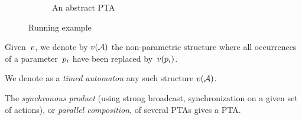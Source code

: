 \begin{tikzborder}{\cite{Gargantini16:validation}}
\begin{tikzborder}{\cite{gargantini_combinatorial_2017}}
\begin{tikzborder}{\cite{gargantini_combinatorial_2017}}
\begin{tikzborder}{\cite{garn2019}}
\begin{tikzborder}{\cite{arcaini2019achieving}}
\begin{tikzborder}{\cite{arcaini2019varivolution}}
\begin{figure}[!htb]
\begin{subfigure}[b]{0.49\textwidth}
		\caption{An abstract PTA}
		\label{figure:example-PTA}
		
	\end{subfigure}
	\caption{Running example}
	\label{figure:example}
\end{figure}

\begin{tikzborder}{}
Given~$v$, we denote by $v(\mathcal{A})$ the non-parametric structure where all occurrences of a parameter~$p_i$ have been replaced by~$v(p_i)$.

We denote as a \emph{timed automaton} any such structure $v(\mathcal{A})$.

The \emph{synchronous product} (using strong broadcast, \ie{} synchronization on a given set of actions), or \emph{parallel composition}, of several PTAs gives a PTA. %


\end{tikzborder}
\end{tikzborder}
\end{tikzborder}
\end{tikzborder}
\end{tikzborder}
\end{tikzborder}
\end{tikzborder}
